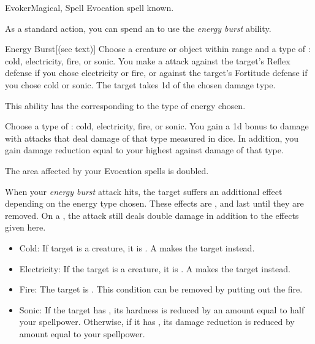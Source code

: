     \begin{feat}{Evoker}{Magical, Spell}
        \featpre Evocation spell known.

         As a standard action, you can spend an  to use the \textit{energy burst} ability.
        \begin{ability}{Energy Burst}[(see text)]
            Choose a creature or object within \rngclose range and a type of : cold, electricity, fire, or sonic.
            You make a  attack against the target's Reflex defense if you chose electricity or fire, or against the target's Fortitude defense if you chose cold or sonic.
            \hit The target takes  \plus1d of the chosen damage type.

            This ability has the  corresponding to the type of energy chosen.
        \end{ability}

         Choose a type of : cold, electricity, fire, or sonic.
        You gain a \plus1d bonus to damage with attacks that deal damage of that type measured in dice.
        In addition, you gain damage reduction equal to your highest  against damage of that type.

         The area affected by your Evocation spells is doubled.

         When your \textit{energy burst} attack hits, the target suffers an additional effect depending on the energy type chosen.
        These effects are , and last until they are removed.
        On a , the attack still deals double damage in addition to the effects given here.
        \begin{itemize}
            \item Cold: If target is a creature, it is \fatigued.
                A  makes the target \exhausted instead.
            \item Electricity: If the target is a creature, it is \dazed.
                A  makes the target \stunned instead.
            \item Fire: The target is \ignited. This condition can be removed by putting out the fire.
            \item Sonic: If the target has , its hardness is reduced by an amount equal to half your spellpower. Otherwise, if it has , its damage reduction is reduced by amount equal to your spellpower.
        \end{itemize}


\end{feat}
